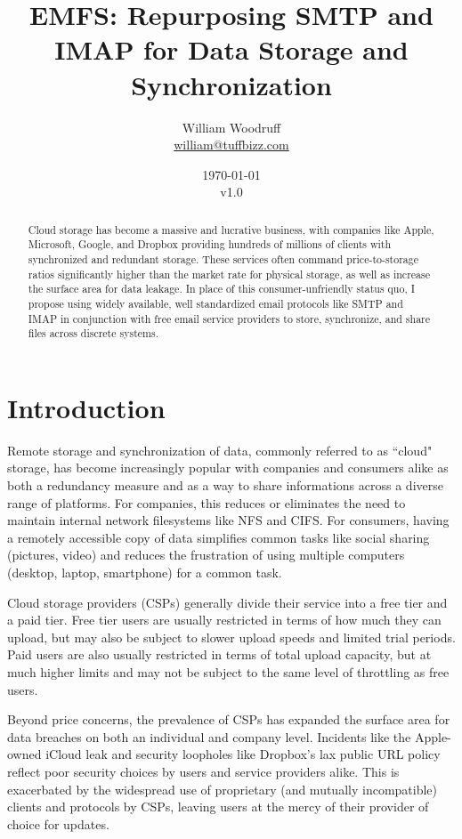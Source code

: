 \documentclass[12pt]{article}
\title{EMFS: Repurposing SMTP and IMAP for Data Storage and Synchronization}
\author{
	William Woodruff \\
	\href{mailto:william@tuffbizz.com}{william@tuffbizz.com}
}
\date{
	\today \\
	v1.0
}
\begin{document}
\maketitle

\begin{abstract}
\noindent Cloud storage has become a massive and lucrative business, with
companies like Apple, Microsoft, Google, and Dropbox providing hundreds of
millions of clients with synchronized and redundant storage. These services
often command price-to-storage ratios significantly higher than the market
rate for physical storage, as well as increase the surface area for data
leakage. In place of this consumer-unfriendly status quo, I propose using widely
available, well standardized email protocols like SMTP and IMAP in
conjunction with free email service providers to store, synchronize, and share
files across discrete systems.
\end{abstract}

\newpage

\begin{spacing}{0.95}
\tableofcontents
\end{spacing}

\newpage

\section{Introduction}
Remote storage and synchronization of data, commonly referred to as ``cloud"
storage, has become increasingly popular with companies and consumers alike
as both a redundancy measure and as a way to share informations across a diverse
range of platforms. For companies, this reduces or eliminates the need to
maintain internal network filesystems like NFS and CIFS. For consumers, having
a remotely accessible copy of data simplifies common tasks like social sharing
(pictures, video) and reduces the frustration of using multiple computers
(desktop, laptop, smartphone) for a common task.

Cloud storage providers (CSPs) generally divide their service into a free
tier and a paid tier. Free tier users are usually restricted in terms of how
much they can upload, but may also be subject to slower upload speeds and
limited trial periods. Paid users are also usually restricted in terms of total
upload capacity, but at much higher limits and may not be subject to the same
level of throttling as free users.

Beyond price concerns, the prevalence of CSPs has expanded the surface area for
data breaches on both an individual and company level. Incidents like the
Apple-owned iCloud leak \cite{Apple2014} and security loopholes like Dropbox's
lax public URL policy \cite{Cluley2014} reflect poor security choices by users
and service providers alike. This is exacerbated by the widespread use of
proprietary (and mutually incompatible) clients and protocols by CSPs, leaving
users at the mercy of their provider of choice for updates.
\end{document}
